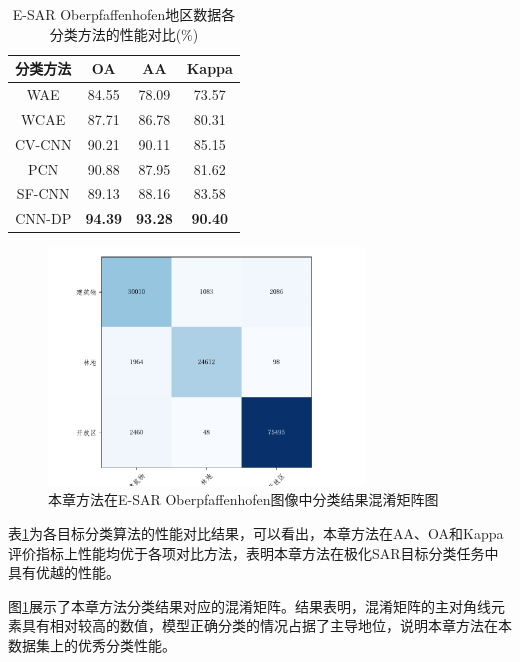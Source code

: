 \begin{table}[ht!]
    \caption{E-SAR Oberpfaffenhofen地区数据各分类方法的性能对比(\%)}
    \label{tab:ober-diff}
    \begin{tabular}{cccc}
        \toprule[1.5bp]
        分类方法   & OA             & AA             & Kappa          \\
        \midrule[0.75bp]
        WAE    & 84.55          & 78.09          & 73.57          \\
        WCAE   & 87.71          & 86.78          & 80.31          \\
        CV-CNN & 90.21          & 90.11          & 85.15          \\
        PCN    & 90.88          & 87.95          & 81.62          \\
        SF-CNN & 89.13          & 88.16          & 83.58          \\
        CNN-DP & \textbf{94.39} & \textbf{93.28} & \textbf{90.40} \\
        \bottomrule[1.5bp]
    \end{tabular}
\end{table}

\begin{figure}[ht!]
    \centering
    \includegraphics[width=8.4cm]{pic/chapter3/ober/conf-matrix.pdf}
    \caption{本章方法在E-SAR Oberpfaffenhofen图像中分类结果混淆矩阵图}
    \label{fig:ober_conf_matrix}
\end{figure}

表\ref{tab:ober-diff}为各目标分类算法的性能对比结果，可以看出，本章方法在AA、OA和Kappa评价指标上性能均优于各项对比方法，表明本章方法在极化SAR目标分类任务中具有优越的性能。

图\ref{fig:ober_conf_matrix}展示了本章方法分类结果对应的混淆矩阵。结果表明，混淆矩阵的主对角线元素具有相对较高的数值，模型正确分类的情况占据了主导地位，说明本章方法在本数据集上的优秀分类性能。

